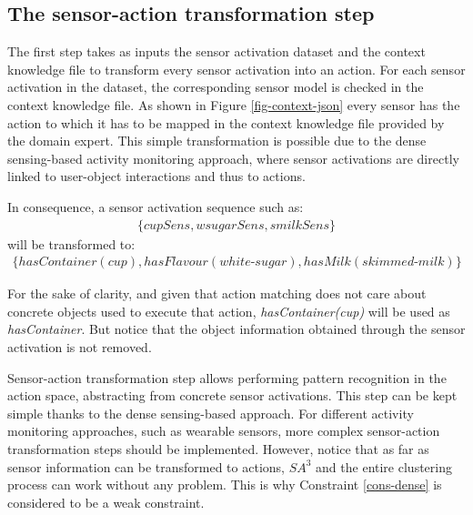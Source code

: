 
\subsection{The sensor-action transformation step}
\label{subsec:clustering:sa3:transform}

The first step takes as inputs the sensor activation dataset and the context knowledge file to transform every sensor activation into an action. For each sensor activation in the dataset, the corresponding sensor model is checked in the context knowledge file. As shown in Figure \ref{fig-context-json} every sensor has the action to which it has to be mapped in the context knowledge file provided by the domain expert. This simple transformation is possible due to the dense sensing-based activity monitoring approach, where sensor activations are directly linked to user-object interactions and thus to actions. 

In consequence, a sensor activation sequence such as:
 \begin{equation*}
 \begin{split}
   \{cupSens, wsugarSens, smilkSens\}
 \end{split}  
 \end{equation*}
 will be transformed to:
 \begin{equation*}
 \begin{split}
  \{hasContainer(cup), hasFlavour(white\text{-}sugar), hasMilk(skimmed\text{-}milk)\}
 \end{split}   
 \end{equation*}
 
For the sake of clarity, and given that action matching does not care about concrete objects used to execute that action, \textit{hasContainer(cup)} will be used as \textit{hasContainer}. But notice that the object information obtained through the sensor activation is not removed. 

Sensor-action transformation step allows performing pattern recognition in the action space, abstracting from concrete sensor activations. This step can be kept simple thanks to the dense sensing-based approach. For different activity monitoring approaches, such as wearable sensors, more complex sensor-action transformation steps should be implemented. However, notice that as far as sensor information can be transformed to actions, $SA^3$ and the entire clustering process can work without any problem. This is why Constraint \ref{cons-dense} is considered to be a weak constraint.

